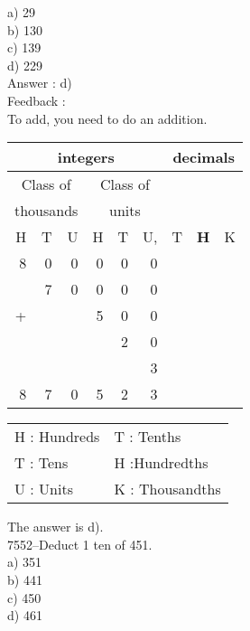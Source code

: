 \documentclass[letterpaper, 12pt]{article}
\begin{document}
a) 29\\
b) 130\\
c) 139\\
d) 229\\

Answer : d)\\

Feedback :\\
To add, you need to do an addition.
\begin{center}
\begin{tabular}{|rrr|rrr|rrr|}
\hline
\multicolumn{6}{|c|}{integers} &\multicolumn{3}{|c|}{decimals} \\
\hline
\multicolumn{3}{|c|}{Class of} &\multicolumn{3}{|c|}{Class of} &  \multicolumn{3}{c|}{} \\
\multicolumn{3}{|c|}{thousands} &\multicolumn{3}{|c|}{units} &  \multicolumn{3}{c|}{} \\
\hline
H & T & U &H & T & U, & T\up{th} & \textbf{H\up{th}} & K\up{th} \\
\hline
\hline
8 & 0 & 0 & 0 & 0 & 0 &  & &\\
 & 7 & 0 & 0 & 0 & 0 &  & &\\
+ &  &  & 5 & 0 & 0 &  & &\\
 &  &  &  & 2 & 0 &  & &\\
 &  &  &  &  & 3 &  & &\\
\hline
\hline
 8 & 7 & 0 & 5 & 2 & 3 &  & &
\\
\hline
\end{tabular}
\end{center}

\scriptsize
\begin{center}
\begin{tabular}{ll}
H : Hundreds & T\up{th} : Tenths\\
T : Tens & H\up{th} :Hundredths\\
U : Units & K\up{e} : Thousandths\\
\end{tabular}
\end{center}

\normalsize
The answer is d).\\




7552--Deduct 1 ten of 451.\\

a) 351\\
b) 441\\
c) 450\\
d) 461\\
\end{document}
